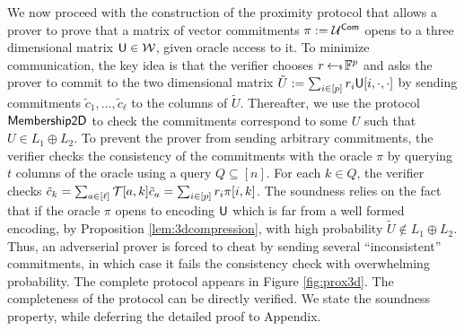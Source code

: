 We now proceed with the construction of the proximity protocol
that allows a prover to prove that a matrix of vector commitments $\pi := \mathcal{U}^{\mathsf{Com}}$ opens to a three
dimensional matrix $\mathsf{U}\in \mathcal{W}$, given oracle access to it. To minimize communication, the key idea is that the verifier chooses
$r\hskip2.3pt{\gets\!\!\mbox{\tiny${\$}$\normalsize}}\, \mathbb{F}^p$ and asks the prover to commit to the two dimensional
matrix $\tilde{U}:=\sum_{i\in [p]}r_i\mathsf{U}[i,\cdot,\cdot]$ by sending
commitments $\tilde{c}_1,\ldots,\tilde{c}_\ell$ to the columns of $\tilde{U}$.
Thereafter, we use the protocol $\mathsf{Membership2D}$ to check the commitments
correspond to some $U$ such that $U\in L_1\oplus L_2$. To prevent the prover
from sending arbitrary commitments, the verifier checks the consistency of the
commitments with the oracle $\pi$ by querying $t$ columns of the oracle
using a query $Q\subseteq [n]$. For each $k\in Q$, the verifier checks
$\tilde{c}_k = \sum_{a\in [\ell]}\mathcal{T}[a,k]\tilde{c}_a=\sum_{i\in [p]}r_i\pi[i,k]$. The soundness relies on the fact
that if the oracle $\pi$ opens to encoding $\mathsf{U}$ which is far from a well
formed encoding, by Proposition \ref{lem:3dcompression}, with high probability
$\tilde{U}\not\in L_1\oplus L_2$. Thus, an adverserial prover is forced to cheat
by sending several ``inconsistent'' commitments, in which case it fails the
consistency check with overwhelming probability. The complete protocol appears
in Figure \ref{fig:prox3d}. The completeness of the protocol can be directly
verified. We state the soundness property, while deferring the detailed proof to
Appendix.
